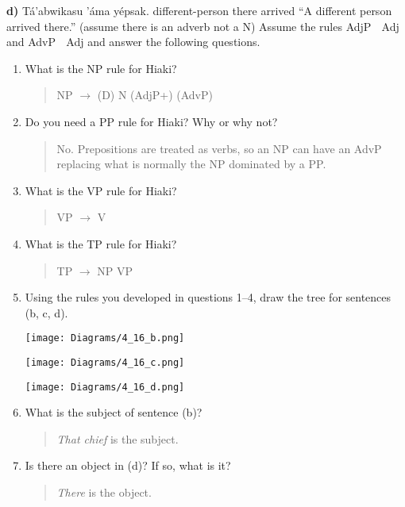 \documentclass[11pt,notitlepage]{article}
\newcommand{\subquestion}[2]{\par\hspace{0.5cm} \textbf{#1)} #2}
\begin{document}
\subquestion{d}{Tá’abwikasu ’áma yépsak.
different-person there arrived
“A different person arrived there.” (assume there is an adverb not a N)
Assume the rules AdjP  Adj and AdvP  Adj and answer the following
questions.}

\begin{enumerate}
\item What is the NP rule for Hiaki?

\begin{quote}
  NP $\rightarrow$ (D) N (AdjP+) (AdvP)
\end{quote}

\item Do you need a PP rule for Hiaki? Why or why not?
  
  \begin{quote}
    No. Prepositions are treated as verbs, so an NP can have an AdvP
    replacing what is normally the NP dominated by a PP.
  \end{quote}

\item What is the VP rule for Hiaki?

  \begin{quote}
    VP $\rightarrow$ V
  \end{quote}

\item What is the TP rule for Hiaki?
  
  \begin{quote}
    TP $\rightarrow$ NP VP
  \end{quote}

\item Using the rules you developed in questions 1–4, draw the tree for
sentences (b, c, d).

\texttt{[image: Diagrams/4\_16\_b.png]}

\texttt{[image: Diagrams/4\_16\_c.png]}

\texttt{[image: Diagrams/4\_16\_d.png]}

\item What is the subject of sentence (b)?

\begin{quote}
  \emph{That chief} is the subject.
\end{quote}

\item Is there an object in (d)? If so, what is it?

  \begin{quote}
    \emph{There} is the object.
  \end{quote}


\end{enumerate}
\end{document}
